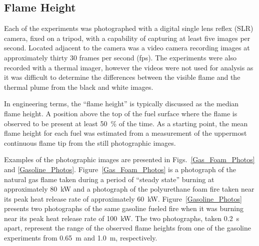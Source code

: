 \documentclass[twoside]{uocthesis}
\begin{document}
{\subsection{Flame Height}

Each of the experiments was photographed with a digital single lens reflex (SLR) camera, fixed on a tripod, with a capability of capturing at least five images per second.  Located adjacent to the camera was a video camera recording images at approximately thirty 30 frames per second (fps).  The experiments were also recorded with a thermal imager, however the videos were not used for analysis as it was difficult to determine the differences between the visible flame and the thermal plume from the black and white images.

In engineering terms, the ``flame height'' is typically discussed as the median flame height.  A position above the top of the fuel surface where the flame is observed to be present at least 50~\% of the time.  As a starting point, the mean flame height for each fuel was estimated from a measurement of the uppermost continuous flame tip from the still photographic images.

Examples of the photographic images are presented in Figs.~\ref{Gas_Foam_Photos} and \ref{Gasoline_Photos}.  Figure~\ref{Gas_Foam_Photos} is a photograph of the natural gas flame taken during a period of ``steady state'' burning at approximately 80~kW and a photograph of the polyurethane foam fire taken near its peak heat release rate of approximately 60~kW.  Figure~\ref{Gasoline_Photos} presents two photographs of the same gasoline fueled fire when it was burning near its peak heat release rate of 100~kW.  The two photographs, taken 0.2~s apart, represent the range of the observed flame heights from one of the gasoline experiments from 0.65~m and 1.0~m, respectively.

}
\end{document}
